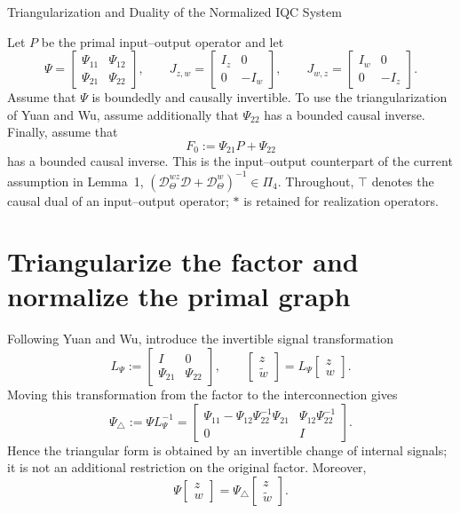 \documentclass[11pt]{article}
\newcommand{\bmat}[1]{\begin{bmatrix}#1\end{bmatrix}}
\begin{document}
\begin{center}
 {\LARGE Triangularization and Duality of the Normalized IQC System}
\end{center}
\vspace{1em}

Let $P$ be the primal input--output operator and let
\begin{equation*}
 \Psi=\bmat{\Psi_{11}&\Psi_{12}\\\Psi_{21}&\Psi_{22}},
 \qquad
 J_{z,w}=\bmat{I_z&0\\0&-I_w},
 \qquad
 J_{w,z}=\bmat{I_w&0\\0&-I_z}.
\end{equation*}
Assume that $\Psi$ is boundedly and causally invertible.  To use the
triangularization of Yuan and Wu, assume additionally that $\Psi_{22}$ has a
bounded causal inverse.  Finally, assume that
\begin{equation*}
 F_0:=\Psi_{21}P+\Psi_{22}
\end{equation*}
has a bounded causal inverse.  This is the input--output counterpart of the
current assumption in Lemma~1,
$(\mathcal D_\Theta^{wz}\mathcal D+\mathcal D_\Theta^w)^{-1}\in\Pi_4$.
Throughout, $\top$ denotes the causal dual of an input--output operator;
$*$ is retained for realization operators.

\section*{Triangularize the factor and normalize the primal graph}

Following Yuan and Wu, introduce the invertible signal transformation
\begin{equation*}
 L_\Psi:=\bmat{I&0\\\Psi_{21}&\Psi_{22}},
 \qquad
 \bmat{z\\\tilde w}=L_\Psi\bmat{z\\w}.
\end{equation*}
Moving this transformation from the factor to the interconnection gives
\begin{equation*}
 \Psi_\triangle:=\Psi L_\Psi^{-1}
 =\bmat{
 \Psi_{11}-\Psi_{12}\Psi_{22}^{-1}\Psi_{21}
 &\Psi_{12}\Psi_{22}^{-1}\\
 0&I
 }.
\end{equation*}
Hence the triangular form is obtained by an invertible change of internal
signals; it is not an additional restriction on the original factor.
Moreover,
\begin{equation*}
 \Psi\bmat{z\\w}
 =\Psi_\triangle\bmat{z\\\tilde w}.
\end{equation*}
\end{document}
